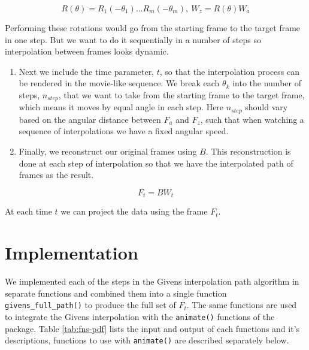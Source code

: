 \[R(\theta) = R_1(-\theta_1) ... R_m(-\theta_m), \    W_z = R(\theta)W_a\]

Performing these rotations would go from the starting frame to the target frame in one step. But we want to do it sequentially in a number of steps so interpolation between frames looks dynamic.

\begin{enumerate}
\def\labelenumi{\arabic{enumi}.}
\setcounter{enumi}{4}
\item
  Next we include the time parameter, \(t\), so that the interpolation process can be rendered in the movie-like sequence. We break each \(\theta_k\) into the number of steps, \(n_{step}\), that we want to take from the starting frame to the target frame, which means it moves by equal angle in each step. Here \(n_{step}\) should vary based on the angular distance between \(F_a\) and \(F_z\), such that when watching a sequence of interpolations we have a fixed angular speed.
\item
  Finally, we reconstruct our original frames using \(B\). This reconstruction is done at each step of interpolation so that we have the interpolated path of frames as the result.
\end{enumerate}

\[F_t = B  W_t\]

At each time \(t\) we can project the data using the frame \(F_t\).

\hypertarget{implementation}{%
\section{Implementation}\label{implementation}}

We implemented each of the steps in the Givens interpolation path algorithm in separate functions and combined them into a single function \texttt{givens\_full\_path()} to produce the full set of \(F_t\). The same functions are used to integrate the Givens interpolation with the \texttt{animate()} functions of the  package. Table \ref{tab:fns-pdf} lists the input and output of each functions and it's descriptions, functions to use with \texttt{animate()} are described separately below.

